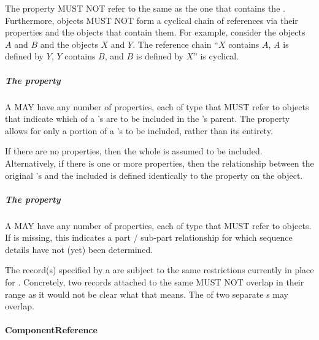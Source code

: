 The  property MUST NOT refer to the same  as the one that contains the .
Furthermore,  objects MUST NOT form a cyclical chain of references via their  properties and the  objects that contain them.
For example, consider the  objects $A$ and $B$ and the  objects $X$ and $Y$. The reference chain ``$X$ contains $A$, $A$ is defined by $Y$, $Y$ contains $B$, and $B$ is defined by $X$'' is cyclical.

\subparagraph{The  property}\label{sec:sourceLocation}

A  MAY have any number of  properties, each of type  that MUST refer to   objects that indicate which  of a 's  are to be included in the 's parent.
The  property allows for only a portion of a 's  to be included, rather than its entirety.

If there are no  properties, then the whole  is assumed to be included. Alternatively,
if there is one or more  properties, then the relationship between the original 's
 and the included  is defined identically to the 
property on the  object.

\subparagraph{The  property}\label{sec:hasLocation:SC}

A  MAY have any number of  properties, each of type  that MUST refer to  objects. If  is missing, this indicates a part / sub-part relationship for which sequence details have not (yet) been determined.

The  record(s) specified by a  are subject to the same restrictions currently in place for  . Concretely, two  records attached to the same  MUST NOT overlap in their range as it would not be clear what that means. The  of two separate s may overlap.

\paragraph{ComponentReference}
\label{sec:ComponentReference}

